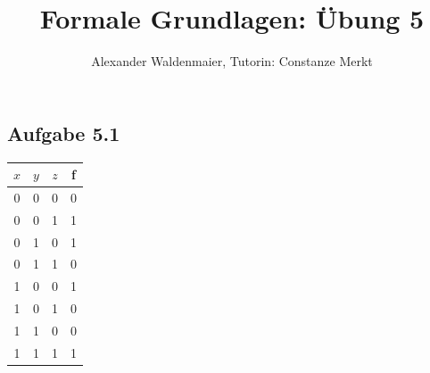 \documentclass{article}
\title{Formale Grundlagen: Übung 5}
\author{Alexander Waldenmaier, Tutorin: Constanze Merkt}
\begin{document}
    \maketitle

    \subsection*{Aufgabe 5.1}
    \begin{table}[h]
        \centering
        \begin{tabular}{ccc|c}
            $x$ & $y$ & $z$ & f \\ \hline
            0 & 0 & 0 & 0 \\
            0 & 0 & 1 & 1 \\
            0 & 1 & 0 & 1 \\
            0 & 1 & 1 & 0 \\
            1 & 0 & 0 & 1 \\
            1 & 0 & 1 & 0 \\
            1 & 1 & 0 & 0 \\
            1 & 1 & 1 & 1
        \end{tabular}
    \end{table}
\end{document}
